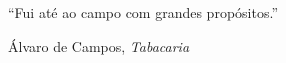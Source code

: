
\vspace*{\fill}
\epigraph{``Fui at\'e  ao campo com grandes prop\'ositos.''}{\'Alvaro de Campos, \textit{Tabacaria}}

